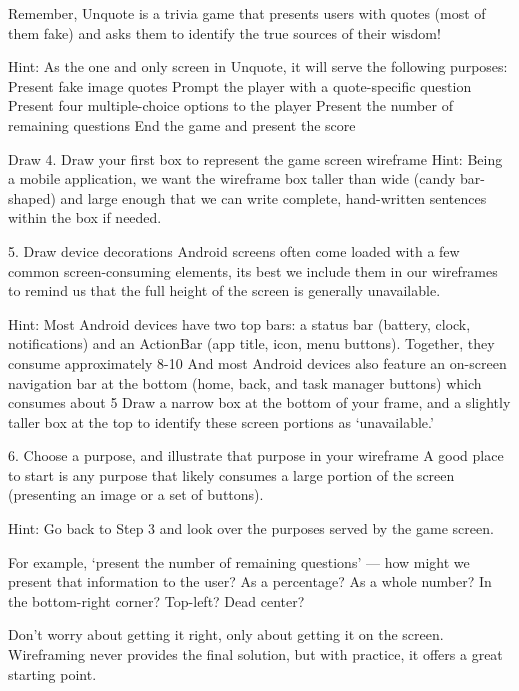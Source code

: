         Remember, Unquote is a trivia game that presents users with quotes (most of them fake) and asks them to identify the true sources of their wisdom!

        Hint: As the one and only screen in Unquote, it will serve the following purposes:
            Present fake image quotes
            Prompt the player with a quote-specific question
            Present four multiple-choice options to the player
            Present the number of remaining questions
            End the game and present the score
    
    Draw
        4. Draw your first box to represent the game screen wireframe
            Hint: Being a mobile application, we want the wireframe box taller than wide (candy bar-shaped) and large enough that we can write complete, hand-written sentences within the box if needed.

        5. Draw device decorations
            Android screens often come loaded with a few common screen-consuming elements, its best we include them in our wireframes to remind us that the full height of the screen is generally unavailable.

            Hint: Most Android devices have two top bars: a status bar (battery, clock, notifications) and an ActionBar (app title, icon, menu buttons). Together, they consume approximately 8-10%
            And most Android devices also feature an on-screen navigation bar at the bottom (home, back, and task manager buttons) which consumes about 5%
            Draw a narrow box at the bottom of your frame, and a slightly taller box at the top to identify these screen portions as ‘unavailable.’

        6. Choose a purpose, and illustrate that purpose in your wireframe
            A good place to start is any purpose that likely consumes a large portion of the screen (presenting an image or a set of buttons).
            
            Hint: Go back to Step 3 and look over the purposes served by the game screen.
            
            For example, ‘present the number of remaining questions’ — how might we present that information to the user? As a percentage? As a whole number? In the bottom-right corner? Top-left? Dead center?
            
            Don’t worry about getting it right, only about getting it on the screen. Wireframing never provides the final solution, but with practice, it offers a great starting point. 
        
